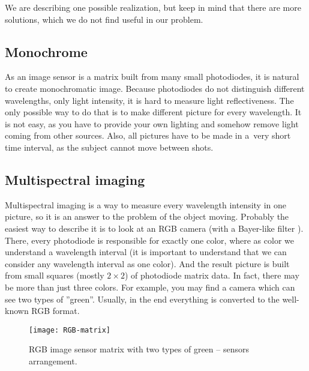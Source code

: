         We are describing one possible realization, but keep in mind that
        there are more solutions, which we do not find useful in our problem.

        \subsection*{Monochrome}
            As an image sensor is a matrix built from many small photodiodes,
            it is natural to create monochromatic image.
            Because photodiodes do not distinguish different
            wavelengths, only light intensity, it is hard
            to measure light reflectiveness.
            The only possible way to do that is to
            make different picture for every wavelength.
            It is not easy, as you have to
            provide your own lighting and somehow remove
            light coming from other sources.
            Also, all pictures have to be made in
            a~very short time interval, as the subject
            cannot move between shots.

        \subsection*{Multispectral imaging}
            Multispectral imaging is a way to measure every wavelength intensity
            in one picture, so it is an answer to the problem of the object moving.
            Probably the easiest way to describe it is to look at an RGB camera
            (with a Bayer-like filter \cite{bayerfilter}).
            There, every photodiode is responsible for exactly one color,
            where as color we understand a wavelength interval (it is important
            to understand that we can consider any wavelength interval as one color).
            And the result picture is built from small squares (mostly $2 \times 2$)
            of photodiode matrix data.
            In fact, there may be more than just three colors.
            For example, you may find a camera which can see two types of ''green''.
            Usually, in the end everything is converted to the well-known RGB format.

            \begin{figure}[H]
                \caption{RGB image sensor matrix with two types of green -- sensors arrangement.}
                \centering
                \texttt{[image: RGB-matrix]}
                \label{fig:RGB-matrix}
            \end{figure}

